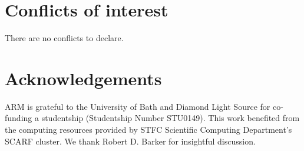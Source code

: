 \documentclass[twoside,twocolumn,9pt]{article}
\renewcommand{\refname}{Notes and references}
\begin{document}
\section*{Conflicts of interest}
There are no conflicts to declare.

\section*{Acknowledgements}
ARM is grateful to the University of Bath and Diamond Light Source for co-funding a studentship (Studentship Number STU0149). This work benefited from the computing resources provided by STFC Scientific Computing Department's SCARF cluster. We thank Robert D. Barker for insightful discussion.


\balance


\end{document}
